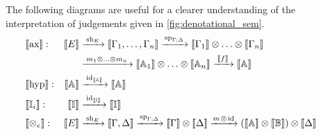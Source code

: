 The following diagrams are useful for a clearer understanding of the interpretation of judgements given in \autoref{fig:denotational_sem}.
\begin{align*}
   & \hspace{-20pt} \llbracket \text{ax} \rrbracket : & [\![E]\!] & \xrightarrow{\hspace{2pt}\text{sh}_{E}\hspace{2pt}}   [\![\Gamma_1,\ldots,\Gamma_n ]\!]   \xrightarrow{\hspace{1pt}\text{sp}_{\Gamma;\Delta}\hspace{1pt}}  \llbracket \Gamma_1 \rrbracket \otimes \ldots \otimes \llbracket \Gamma_n \rrbracket  \\
  & & & \xrightarrow{\hspace{2pt}m_1 \otimes \ldots \otimes m_n \hspace{2pt}} \llbracket \mathbb{A}_1 \rrbracket \otimes \ldots \otimes \llbracket \mathbb{A}_n \rrbracket \xrightarrow{\hspace{2pt}\llbracket f \rrbracket \hspace{2pt}} \llbracket \mathbb{A} \rrbracket \\
  & \hspace{-20pt} \llbracket \text{hyp} \rrbracket : & \llbracket \mathbb{A} \rrbracket & \xrightarrow{\hspace{2pt}\id_{\llbracket \mathbb{A}\rrbracket}\hspace{2pt}} \llbracket \mathbb{A}\rrbracket \\
  & \hspace{-20pt}\llbracket \mathbb{I}_i \rrbracket :&  \llbracket \mathbb{I} \rrbracket & \xrightarrow{\hspace{2pt}\id_{\llbracket \mathbb{I}\rrbracket}\hspace{2pt}}  \llbracket \mathbb{I} \rrbracket\\
  & \hspace{-20pt}\llbracket \otimes_e \rrbracket : & [\![E]\!] & \xrightarrow{\hspace{2pt}\text{sh}_{E}\hspace{2pt}}   [\![\Gamma,\Delta ]\!]   \xrightarrow{\hspace{1pt}\text{sp}_{\Gamma;\Delta}\hspace{1pt}}  [\![\Gamma ]\!] \otimes [\![\Delta ]\!] \xrightarrow{ m \hspace{1pt} \otimes \hspace{1pt} \id} ([\![\mathbb{A} ]\!] \otimes [\![\mathbb{B} ]\!]) \otimes [\![\Delta ]\!]   \\

\end{align*}
